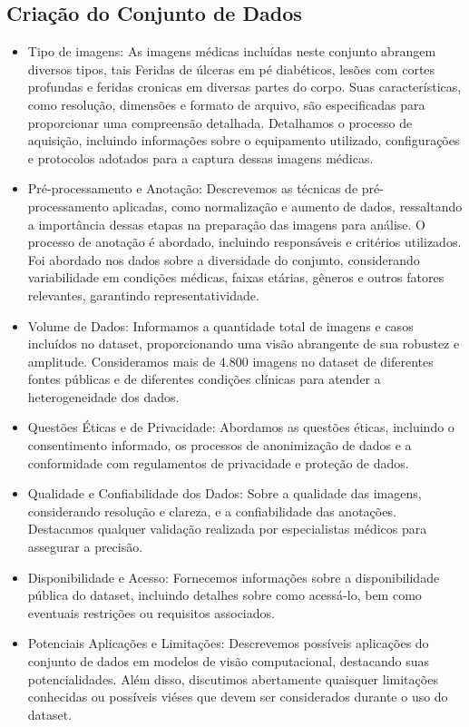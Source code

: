 \subsection{Criação do Conjunto de Dados}
    
    \begin{itemize}
        \item Tipo de imagens: As imagens médicas incluídas neste conjunto abrangem diversos tipos, tais Feridas de úlceras em pé diabéticos, lesões com cortes profundas e feridas cronicas em diversas partes do corpo. Suas características, como resolução, dimensões e formato de arquivo, são especificadas para proporcionar uma compreensão detalhada. Detalhamos o processo de aquisição, incluindo informações sobre o equipamento utilizado, configurações e protocolos adotados para a captura dessas imagens médicas.
    
        \item Pré-processamento e Anotação: Descrevemos as técnicas de pré-processamento aplicadas, como normalização e aumento de dados, ressaltando a importância dessas etapas na preparação das imagens para análise. O processo de anotação é abordado, incluindo responsáveis e critérios utilizados. Foi abordado nos dados sobre a diversidade do conjunto, considerando variabilidade em condições médicas, faixas etárias, gêneros e outros fatores relevantes, garantindo representatividade.
    
        \item Volume de Dados: Informamos a quantidade total de imagens e casos incluídos no dataset, proporcionando uma visão abrangente de sua robustez e amplitude. Consideramos mais de 4.800 imagens no dataset de diferentes fontes públicas e de diferentes condições clínicas para atender a heterogeneidade dos dados.
    
        \item Questões Éticas e de Privacidade: Abordamos as questões éticas, incluindo o consentimento informado, os processos de anonimização de dados e a conformidade com regulamentos de privacidade e proteção de dados.

        \item Qualidade e Confiabilidade dos Dados: Sobre a qualidade das imagens, considerando resolução e clareza, e a confiabilidade das anotações. Destacamos qualquer validação realizada por especialistas médicos para assegurar a precisão.

        \item Disponibilidade e Acesso: Fornecemos informações sobre a disponibilidade pública do dataset, incluindo detalhes sobre como acessá-lo, bem como eventuais restrições ou requisitos associados.

        \item Potenciais Aplicações e Limitações: Descrevemos possíveis aplicações do conjunto de dados em modelos de visão computacional, destacando suas potencialidades. Além disso, discutimos abertamente quaisquer limitações conhecidas ou possíveis viéses que devem ser considerados durante o uso do dataset.

        
    \end{itemize}

